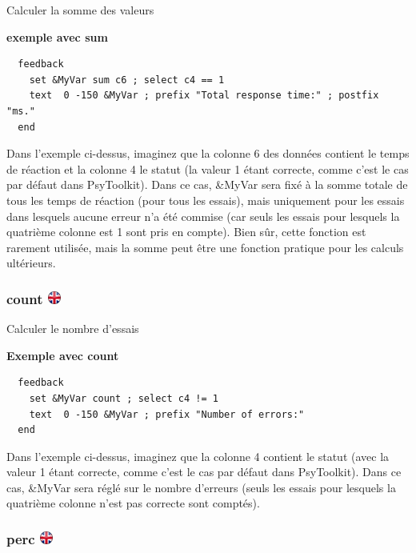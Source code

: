 \documentclass[
]{book}
\begin{document}
Calculer la somme des valeurs

\textbf{exemple avec sum }

\begin{verbatim}
  feedback
    set &MyVar sum c6 ; select c4 == 1
    text  0 -150 &MyVar ; prefix "Total response time:" ; postfix "ms."
  end
\end{verbatim}

Dans l'exemple ci-dessus, imaginez que la colonne 6 des données contient le temps de réaction et la colonne 4 le statut (la valeur 1 étant correcte, comme c'est le cas par défaut dans PsyToolkit). Dans ce cas, \&MyVar sera fixé à la somme totale de tous les temps de réaction (pour tous les essais), mais uniquement pour les essais dans lesquels aucune erreur n'a été commise (car seuls les essais pour lesquels la quatrième colonne est 1 sont pris en compte). Bien sûr, cette fonction est rarement utilisée, mais la somme peut être une fonction pratique pour les calculs ultérieurs.

\hypertarget{count}{%
\subsubsection[count ]{\texorpdfstring{count \href{https://www.psytoolkit.org/doc3.1.0/feedback.html\#_count}{\protect\includegraphics{img/ukflag.png}}}{count }}\label{count}}

Calculer le nombre d'essais

\textbf{Exemple avec count}

\begin{verbatim}
  feedback
    set &MyVar count ; select c4 != 1
    text  0 -150 &MyVar ; prefix "Number of errors:"
  end
\end{verbatim}

Dans l'exemple ci-dessus, imaginez que la colonne 4 contient le statut (avec la valeur 1 étant correcte, comme c'est le cas par défaut dans PsyToolkit). Dans ce cas, \&MyVar sera réglé sur le nombre d'erreurs (seuls les essais pour lesquels la quatrième colonne n'est pas correcte sont comptés).

\hypertarget{perc}{%
\subsubsection[perc ]{\texorpdfstring{perc \href{https://www.psytoolkit.org/doc3.1.0/feedback.html\#_perc}{\protect\includegraphics{img/ukflag.png}}}{perc }}\label{perc}}
\end{document}
